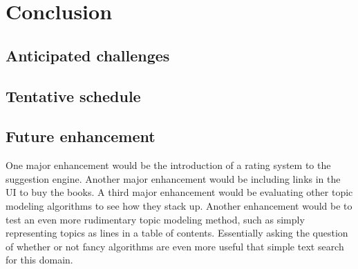 
\section{Conclusion}
\subsection{Anticipated challenges}

\subsection{Tentative schedule}
\subsection{Future enhancement}
One major enhancement would be the introduction of a rating system to the suggestion engine.  
Another major enhancement would be including links in the UI to buy the books.
A third major enhancement would be evaluating other topic modeling algorithms to see how they stack up.
Another enhancement would be to test an even more rudimentary topic modeling method, such as simply representing topics as lines in a table of contents.  
Essentially asking the question of whether or not fancy algorithms are even more useful that simple text search for this domain.